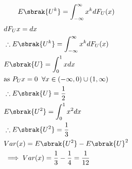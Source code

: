 \documentclass[journal,12pt,twocolumn]{IEEEtran}
\begin{document}
%
\begin{equation}
E\sbrak{U^k} = \int_{-\infty}^{\infty}x^kdF_{U}(x)
\end{equation}
\solution 
\begin{align}
    &dF_{U}{x}=dx\\
    &\therefore E\sbrak{U^k} = \int_{-\infty}^{\infty}x^kdF_{U}(x)\\
    &E\sbrak{U} = \int_{0}^{1}xdx \\
    &\text{as } P_{U}{x}=0 \; \;\forall x \in (-\infty,0)\cup (1,\infty)\\
    &\therefore  E\sbrak{U} = \dfrac{1}{2}\\
    &E\sbrak{U^2}=\int_{0}^{1}x^2dx\\
    &\therefore E\sbrak{U^2}= \dfrac{1}{3}\\
    &Var(x)=E\sbrak{U^2}-{E\sbrak{U}}^2\\
    &\implies Var(x)= \dfrac{1}{3}-\dfrac{1}{4}=\dfrac{1}{12}
\end{align}
\end{document}
